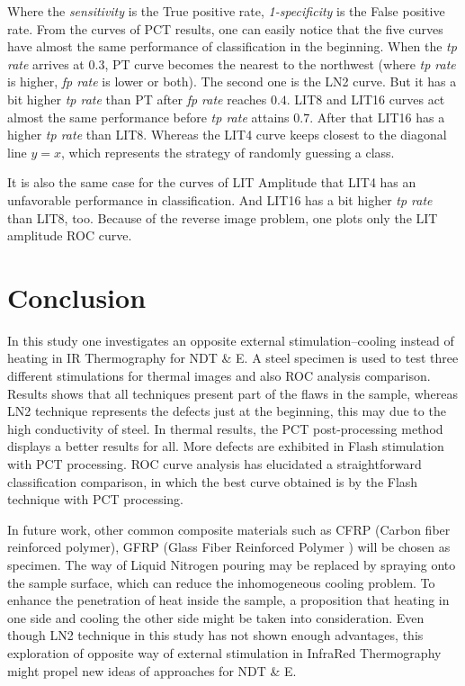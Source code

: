 \documentclass[]{spie}  %
\begin{document}
Where the \textit{sensitivity} is the True positive rate, \textit{1-specificity} is the False positive rate.
From the curves of PCT results, one can easily notice that the five curves have almost the same performance of classification in the beginning. When the \textit{tp rate} arrives at $0.3$, PT curve becomes the nearest to the northwest (where \textit{tp rate} is higher, \textit{fp rate} is lower or both). The second one is the LN2 curve. But it has a bit higher \textit{tp rate} than PT after \textit{fp rate} reaches $0.4$. LIT8 and LIT16 curves act almost the same performance before \textit{tp rate} attains $0.7$. After that LIT16 has a higher \textit{tp rate} than LIT8. Whereas the LIT4 curve keeps closest to the diagonal line $y=x$, which represents the strategy of randomly guessing a class.

It is also the same case for the curves of LIT Amplitude that LIT4 has an unfavorable performance in classification. And LIT16 has a bit higher \textit{tp rate} than LIT8, too. Because of the reverse image problem, one plots only the LIT amplitude ROC curve.



\section{Conclusion} %
\label{sec:conclusion}
In this study one investigates an opposite external stimulation--cooling instead of heating in IR Thermography for NDT \& E. 
A steel specimen is used to test three different stimulations for thermal images and also ROC analysis comparison. 
Results shows that all techniques present part of the flaws in the sample, whereas LN2 technique represents the defects just at the beginning, this may due to the high conductivity of steel. 
In thermal results, the PCT post-processing method displays a better results for all. More defects are exhibited in Flash stimulation with PCT processing.
ROC curve analysis has elucidated a straightforward classification comparison, in which the best curve obtained is by the Flash technique with PCT processing.

In future work, other common composite materials such as CFRP (Carbon fiber reinforced polymer), GFRP (Glass Fiber Reinforced Polymer ) will be chosen as specimen. The way of Liquid Nitrogen pouring may be replaced by spraying onto the sample surface, which can reduce the inhomogeneous cooling problem. To enhance the penetration of heat inside the sample, a proposition that heating in one side and cooling the other side might be taken into consideration.
Even though LN2 technique in this study has not shown enough advantages, this exploration of opposite way of external stimulation in InfraRed Thermography might propel new ideas of approaches for NDT \& E.
\end{document}
